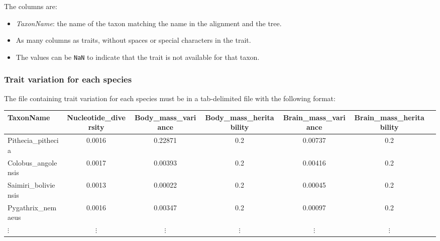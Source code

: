 \documentclass{article}
\providecommand{\DIFdelbegin}{} %
\providecommand{\DIFdelend}{} %
\newcommand{\DIFscaledelfig}{0.5}
\newlength{\DIFdelgraphicswidth} %
\newlength{\DIFdelgraphicsheight} %
\newcommand{\DIFdelincludegraphics}[2][]{%
\sbox{\DIFdelgraphicsbox}{\DIFOincludegraphics[#1]{#2}}%
\settoboxwidth{\DIFdelgraphicswidth}{\DIFdelgraphicsbox} %
\settoboxtotalheight{\DIFdelgraphicsheight}{\DIFdelgraphicsbox} %
\scalebox{\DIFscaledelfig}{%
\parbox[b]{\DIFdelgraphicswidth}{\usebox{\DIFdelgraphicsbox}\\[-\baselineskip] \rule{\DIFdelgraphicswidth}{0em}}\llap{\resizebox{\DIFdelgraphicswidth}{\DIFdelgraphicsheight}{%
\setlength{\unitlength}{\DIFdelgraphicswidth}%
\begin{picture}(1,1)%
\thicklines\linethickness{2pt} %
{\color[rgb]{1,0,0}\put(0,0){\framebox(1,1){}}}%
{\color[rgb]{1,0,0}\put(0,0){\line( 1,1){1}}}%
{\color[rgb]{1,0,0}\put(0,1){\line(1,-1){1}}}%
\end{picture}%
}\hspace*{3pt}}} %
} %
\DeclareRobustCommand{\DIFdelbegin}{\DIFOdelbegin \let\includegraphics\DIFdelincludegraphics} %
\DeclareRobustCommand{\DIFdelend}{\DIFOaddend \let\includegraphics\DIFOincludegraphics} %
\begin{document}
The columns are:
\begin{itemize}
    \item \emph{TaxonName}: the name of the taxon matching the name in the alignment and the tree.
    \item As many columns as traits, without spaces or special characters in the trait.
    \item The values can be \texttt{NaN} to indicate that the trait is not available for that taxon.
\end{itemize}

\newpage
\subsubsection{Trait variation for each species}
\DIFdelbegin %
\DIFdelend 

The file containing trait variation for each species must be in a tab-delimited file with the following format:
\begin{center}
    \begin{adjustbox}{width = 1.0\textwidth}
        \begin{tabular}{|l|c|c|c|c|c|c|}
            \hline
            TaxonName            & Nucleotide\_diversity & Body\_mass\_variance & Body\_mass\_heritability & Brain\_mass\_variance & Brain\_mass\_heritability \\
            \hline
            Pithecia\_pithecia   & 0.0016                & 0.22871              & 0.2                      & 0.00737               & 0.2                       \\
            Colobus\_angolensis  & 0.0017                & 0.00393              & 0.2                      & 0.00416               & 0.2                       \\
            Saimiri\_boliviensis & 0.0013                & 0.00022              & 0.2                      & 0.00045               & 0.2                       \\
            Pygathrix\_nemaeus   & 0.0016                & 0.00347              & 0.2                      & 0.00097               & 0.2                       \\
            $\vdots$             & $\vdots$              & $\vdots$             & $\vdots$                 & $\vdots$              & $\vdots$                  \\
            \hline
        \end{tabular}
        \label{tab:trait-variance}
    \end{adjustbox}
\end{center}
\end{document}
